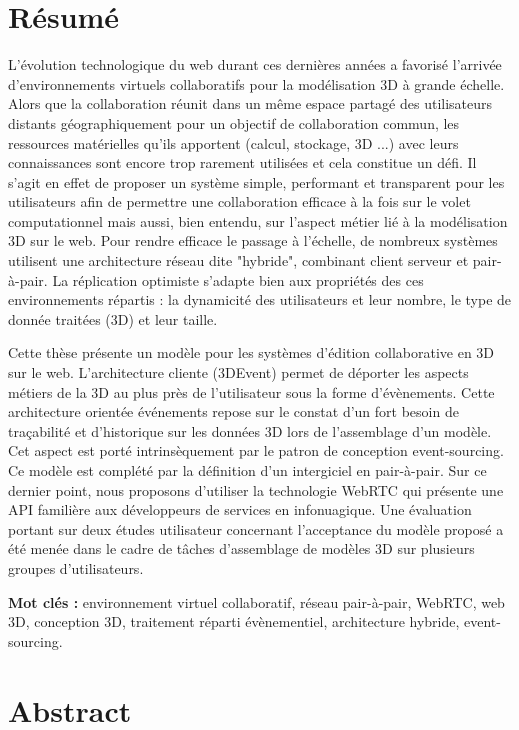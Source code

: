 \clearpage
\pagebreak
{\centering
\section*{Résumé}}
\small 
L’évolution technologique du web durant ces dernières années a favorisé l’arrivée 
d’environnements virtuels collaboratifs pour la modélisation 3D à grande échelle. 
Alors que la collaboration réunit dans un même espace partagé des utilisateurs 
distants géographiquement pour un objectif de collaboration commun, les 
ressources 
matérielles qu'ils apportent (calcul, stockage, 3D ...) avec leurs connaissances 
sont encore trop rarement utilisées et cela constitue un défi. Il s'agit en effet 
de proposer un système simple, performant et transparent pour les utilisateurs 
afin de permettre une collaboration efficace à la fois sur le volet computationnel 
mais aussi, bien entendu, sur l'aspect métier lié à la modélisation 3D sur le web.
Pour rendre efficace le passage à l’échelle, de nombreux systèmes utilisent une 
architecture réseau dite "hybride", combinant client serveur et pair-à-pair. La 
réplication optimiste s'adapte bien aux propriétés des ces environnements répartis 
: la dynamicité des utilisateurs et leur nombre, le type de donnée traitées (3D) 
et leur taille. 

Cette thèse présente un modèle pour les systèmes d’édition collaborative en 3D 
sur le web. L'architecture cliente (3DEvent) permet de déporter les 
aspects métiers de la 3D au plus près de l’utilisateur sous la forme d’évènements. 
Cette architecture orientée événements repose sur le constat 
d’un fort besoin de traçabilité et d’historique sur les données 3D lors de 
l’assemblage d’un modèle. Cet aspect est porté intrinsèquement par le patron de 
conception event-sourcing. Ce modèle est complété par la définition d’un 
intergiciel en pair-à-pair. Sur ce dernier point, nous proposons d'utiliser la 
technologie WebRTC qui présente une API familière aux développeurs de services 
en infonuagique. Une évaluation portant sur deux études utilisateur concernant 
l’acceptance du modèle proposé a été menée dans le cadre de tâches 
d’assemblage de 
modèles 3D sur plusieurs groupes d’utilisateurs.

\textbf{Mot clés :} environnement virtuel collaboratif, réseau pair-à-pair, 
WebRTC, web 3D, conception 3D, traitement réparti évènementiel, architecture 
hybride, event-sourcing.

{\centering
\section*{Abstract}}

